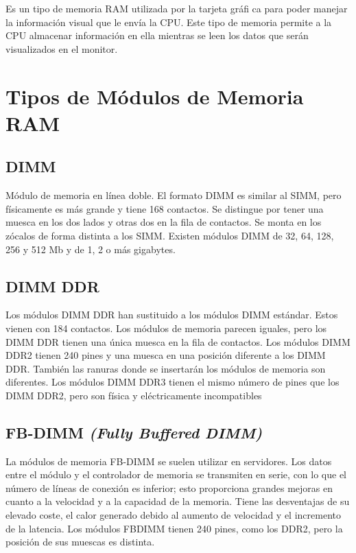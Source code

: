 \documentclass[11pt]{article}
\begin{document}
Es un tipo de memoria RAM
utilizada por la tarjeta gráfi ca para poder manejar la información
visual que le envía la CPU. Este tipo de memoria permite a la CPU
almacenar información en ella mientras se leen los datos que serán
visualizados en el monitor.


\section{Tipos de Módulos de Memoria RAM}
\label{sec:org26d34ea}

\subsection{DIMM}
\label{sec:org009ff35}

Módulo de memoria en línea doble. El formato DIMM es
similar al SIMM, pero físicamente es más grande y tiene 168
contactos. Se distingue por tener una muesca en los dos lados
y otras dos en la fila de contactos. Se monta en los zócalos de
forma distinta a los SIMM. Existen módulos DIMM de 32, 64,
128, 256 y 512 Mb y de 1, 2 o más gigabytes.

\subsection{DIMM DDR}
\label{sec:org39a98b0}

Los módulos DIMM DDR han sustituido a los módulos DIMM
estándar. Estos vienen con 184 contactos. Los módulos de
memoria parecen iguales, pero los DIMM DDR tienen una única
muesca en la fila de contactos.
Los módulos DIMM DDR2 tienen 240 pines y una muesca en
una posición diferente a los DIMM DDR. También las ranuras
donde se insertarán los módulos de memoria son diferentes.
Los módulos DIMM DDR3 tienen el mismo número de pines
que los DIMM DDR2, pero son física y eléctricamente
incompatibles

\subsection{FB-DIMM \emph{(Fully Buffered DIMM)}}
\label{sec:org274db26}

La módulos de memoria FB-DIMM se suelen utilizar en
servidores. Los datos entre el módulo y el controlador de
memoria se transmiten en serie, con lo que el número de líneas
de conexión es inferior; esto proporciona grandes mejoras en
cuanto a la velocidad y a la capacidad de la memoria. Tiene
las desventajas de su elevado coste, el calor generado debido
al aumento de velocidad y el incremento de la latencia. Los
módulos FBDIMM tienen 240 pines, como los DDR2, pero la
posición de sus muescas es distinta.
\end{document}
